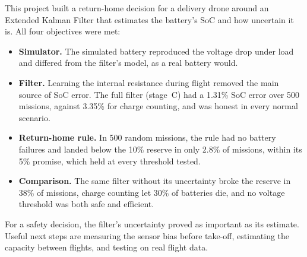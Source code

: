 
\label{sec:c_objectives}\label{sec:c_next}This project built a return-home decision for a delivery drone around an Extended Kalman Filter that estimates the battery's SoC and how uncertain it is. All four objectives were met:
\begin{itemize}
  \item \textbf{Simulator.} The simulated battery reproduced the voltage drop under load and differed from the filter's model, as a real battery would.
  \item \textbf{Filter.} Learning the internal resistance during flight removed the main source of SoC error. The full filter (stage~C) had a 1.31\% SoC error over 500 missions, against 3.35\% for charge counting, and was honest in every normal scenario.
  \item \textbf{Return-home rule.} In 500 random missions, the rule had no battery failures and landed below the 10\% reserve in only 2.8\% of missions, within its 5\% promise, which held at every threshold tested.
  \item \textbf{Comparison.} The same filter without its uncertainty broke the reserve in 38\% of missions, charge counting let 30\% of batteries die, and no voltage threshold was both safe and efficient.
\end{itemize}

For a safety decision, the filter's uncertainty proved as important as its estimate. Useful next steps are measuring the sensor bias before take-off, estimating the capacity between flights, and testing on real flight data.
